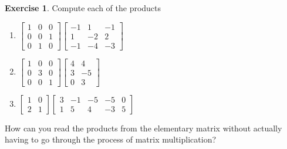 \documentclass[handout]{beamer}
\newcommand{\fn}{\insertframenumber}
\theoremstyle{definition}
\newtheorem{exercise}{Exercise}
\begin{document}
\begin{frame}{\fn}
	\begin{exercise}
		Compute each of the products
		\begin{enumerate}[label=(\alph*)]
			\item $\begin{bmatrix}1&0&0\\0&0&1\\0&1&0\end{bmatrix}\left[\begin{array}{rrr}
			-1 & 1 & -1 \\
			1 & -2 & 2 \\
			-1 & -4 & -3
			\end{array}\right]$
			\item $\begin{bmatrix}1&0&0\\0&3&0\\0&0&1\end{bmatrix}\left[\begin{array}{rr}
			4 & 4 \\
			3 & -5 \\
			0 & 3
			\end{array}\right]$
			\item $\begin{bmatrix}1&0\\2&1\end{bmatrix} \left[\begin{array}{rrrrr}
			3 & -1 & -5 & -5 & 0 \\
			1 & 5 & 4 & -3 & 5
			\end{array}\right]$
		\end{enumerate}
		How can you read the products from the elementary matrix without actually having to go through the process of matrix multiplication?
	\end{exercise}
\end{frame}
\end{document}
